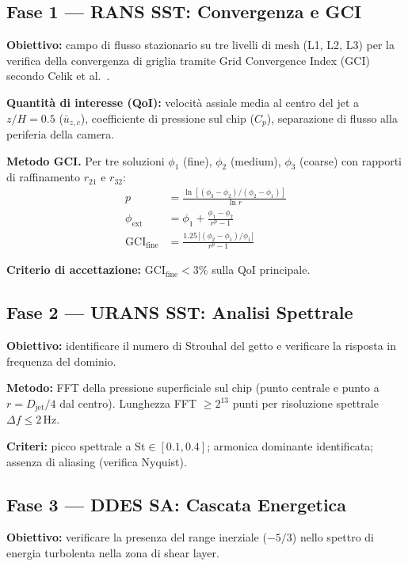 \documentclass[11pt,a4paper]{article}
\newcommand{\Djet}{D_{\mathrm{jet}}}
\newcommand{\Str}{\mathrm{St}}
\begin{document}
\subsection{Fase 1 — RANS SST: Convergenza e GCI}

\textbf{Obiettivo:} campo di flusso stazionario su tre livelli di mesh (L1, L2, L3) per la verifica della convergenza di griglia tramite Grid Convergence Index (GCI) secondo Celik et al.\ \cite{Celik2008}.

\textbf{Quantità di interesse (QoI):} velocità assiale media al centro del jet a $z/H=0.5$ ($\bar{u}_{z,c}$), coefficiente di pressione sul chip ($C_p$), separazione di flusso alla periferia della camera.

\textbf{Metodo GCI.} Per tre soluzioni $\phi_1$ (fine), $\phi_2$ (medium), $\phi_3$ (coarse) con rapporti di raffinamento $r_{21}$ e $r_{32}$:
\begin{align}
  p &= \frac{\ln\left[(\phi_3-\phi_2)/(\phi_2-\phi_1)\right]}{\ln r} \\
  \phi_{\mathrm{ext}} &= \phi_1 + \frac{\phi_1 - \phi_2}{r^p - 1} \\
  \mathrm{GCI}_{\mathrm{fine}} &= \frac{1.25\,|(\phi_2-\phi_1)/\phi_1|}{r^p-1}
\end{align}

\textbf{Criterio di accettazione:} $\mathrm{GCI}_{\mathrm{fine}} < 3\%$ sulla QoI principale.

\subsection{Fase 2 — URANS SST: Analisi Spettrale}

\textbf{Obiettivo:} identificare il numero di Strouhal del getto e verificare la risposta in frequenza del dominio.

\textbf{Metodo:} FFT della pressione superficiale sul chip (punto centrale e punto a $r = \Djet/4$ dal centro). Lunghezza FFT $\geq 2^{13}$ punti per risoluzione spettrale $\Delta f \leq 2$\,Hz.

\textbf{Criteri:} picco spettrale a $\Str \in [0.1, 0.4]$; armonica dominante identificata; assenza di aliasing (verifica Nyquist).

\subsection{Fase 3 — DDES SA: Cascata Energetica}

\textbf{Obiettivo:} verificare la presenza del range inerziale ($-5/3$) nello spettro di energia turbolenta nella zona di shear layer.
\end{document}
